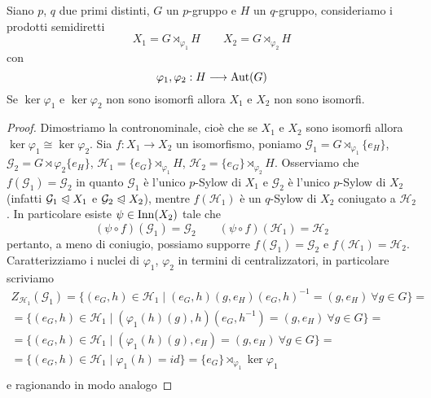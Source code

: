 \documentclass[11pt]{scrartcl}
\begin{document}
\begin{proposition}
    Siano $p$, $q$ due primi distinti, $G$ un $p$-gruppo e $H$ un $q$-gruppo,
    consideriamo i prodotti semidiretti 
    \[
        X_1 = G\rtimes_{\varphi_1}H \qquad X_2 = G\rtimes_{\varphi_2}H
    \]
    con 
    \[
        \varphi_1, \varphi_2 :H \longrightarrow \operatorname{Aut}(G)
    \]
    Se $\ker\varphi_1$ e $\ker\varphi_2$ non sono isomorfi allora $X_1$ e 
    $X_2$ non sono isomorfi.
\end{proposition}

\begin{proof}
    Dimostriamo la contronominale, cioè che se $X_1$ e $X_2$ sono isomorfi
    allora $\ker\varphi_1 \cong \ker\varphi_2$.\newline
    Sia $f: X_1\longrightarrow X_2$ un isomorfismo, poniamo $\mathcal{G}_1 = 
    G\rtimes_{\varphi_1}\{e_H\}$, $\mathcal{G}_2 = G\rtimes{\varphi_2}\{e_H\}$,
    $\mathcal{H}_1 = \{e_G\}\rtimes_{\varphi_1}H$, $\mathcal{H}_2 = \{e_G\}\rtimes_{\varphi_2}H$.
    Osserviamo che $f(\mathcal{G}_1) = \mathcal{G}_2$ in quanto $\mathcal{G}_1$
    è l'unico $p$-Sylow di $X_1$ e $\mathcal{G}_2$ è l'unico $p$-Sylow di $X_2$
    (infatti $\mathcal{G}_1 \trianglelefteqslant X_1$ e $\mathcal{G}_2 
    \trianglelefteqslant X_2$), mentre $f(\mathcal{H}_1)$ è un $q$-Sylow di $X_2$
    coniugato a $\mathcal{H}_2$. In particolare esiste $\psi \in \operatorname{Inn}(X_2)$
    tale che
    \[
        (\psi\circ f)(\mathcal{G}_1) = \mathcal{G}_2 \qquad 
        (\psi\circ f)(\mathcal{H}_1) = \mathcal{H}_2
    \]
    pertanto, a meno di coniugio, possiamo supporre $f(\mathcal{G}_1) = \mathcal{G}_2$ e 
    $f(\mathcal{H}_1) = \mathcal{H}_2$. Caratterizziamo i nuclei di $\varphi_1$, 
    $\varphi_2$ in termini di centralizzatori, in particolare scriviamo
    \begin{multline*}
        Z_{\mathcal{H}_1}(\mathcal{G}_1) = \{(e_G, h) \in \mathcal{H}_1\mid
        (e_G, h)(g, e_H)(e_G, h)^{-1} = (g, e_H)~\forall g \in G\} = \\
        = \{(e_G, h)\in \mathcal{H}_1 \mid (\varphi_1(h)(g), h)(e_G, h^{-1})
        = (g, e_H)~\forall g \in G\} = \\
        = \{(e_G, h) \in \mathcal{H}_1\mid (\varphi_1(h)(g), e_H) = (g, e_H)~
        \forall g \in G\} = \\
        = \{(e_G, h) \in \mathcal{H}_1\mid \varphi_1(h) = id\} =
        \{e_G\}\rtimes_{\varphi_1}\ker\varphi_1\\
    \end{multline*}
    e ragionando in modo analogo

\end{proof}
\end{document}
